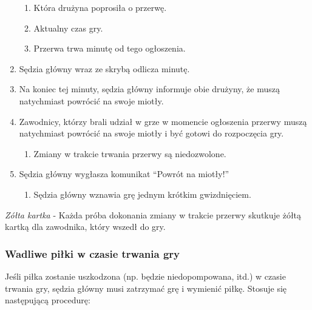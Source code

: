 \documentclass[12pt]{article}
\begin{document}
\begin{enumerate}
	      \begin{enumerate}
		      \item
		            Która drużyna poprosiła o przerwę.
		      \item
		            Aktualny czas gry.
		      \item
		            Przerwa trwa minutę od tego ogłoszenia.
	      \end{enumerate}
	\item
	      Sędzia główny wraz ze skrybą odlicza minutę.
	\item
	      Na koniec tej minuty, sędzia główny informuje obie drużyny, że muszą
	      natychmiast powrócić na swoje miotły.
	\item
	      Zawodnicy, którzy brali udział w grze w momencie ogłoszenia przerwy
	      muszą natychmiast powrócić na swoje miotły i być gotowi do rozpoczęcia
	      gry.

	      \begin{enumerate}
		      \item
		            Zmiany w trakcie trwania przerwy są niedozwolone.
	      \end{enumerate}
	\item
	      Sędzia główny wygłasza komunikat ``Powrót na miotły!''

	      \begin{enumerate}
		      \item
		            Sędzia główny wznawia grę jednym krótkim gwizdnięciem.
	      \end{enumerate}
\end{enumerate}

\emph{Zółta kartka} - Każda próba dokonania zmiany w trakcie przerwy
skutkuje żółtą kartką dla zawodnika, który wszedł do gry.

\subsubsection{Wadliwe piłki w czasie trwania gry}

Jeśli piłka zostanie uszkodzona (np. będzie niedopompowana, itd.) w
czasie trwania gry, sędzia główny musi zatrzymać grę i wymienić piłkę.
Stosuje się następującą procedurę:
\end{document}
